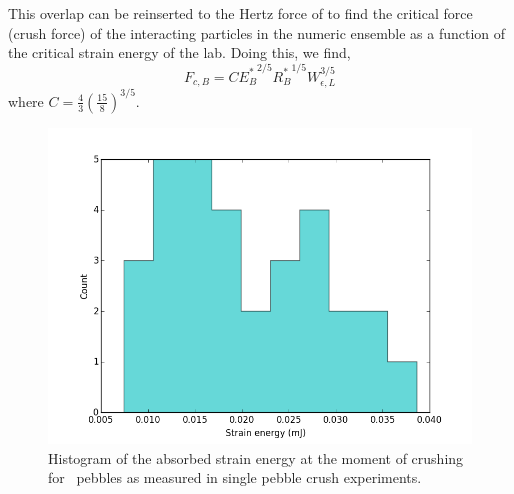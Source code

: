 This overlap can be reinserted to the Hertz force of  to find the critical force (crush force) of the interacting particles in the numeric ensemble as a function of the critical strain energy of the lab. Doing this, we find,
\begin{equation}\label{eq:peb_hertz}
	F_{c,B} = C{E_B^*}^{2/5}{R_B^*}^{1/5}W_{\epsilon,L}^{3/5}
\end{equation}
where $C = \frac{4}{3}\left(\frac{15}{8}\right)^{3/5}$.
\begin{figure}[ht]
\centering
    \includegraphics[width=\doubleimagewidth]{figures/fzk-w-histogram.png}
    \caption{Histogram of the absorbed strain energy at the moment of crushing for \lis~pebbles as measured in single pebble crush experiments.}
    \label{fig:fzk-w-hist}
\end{figure}

